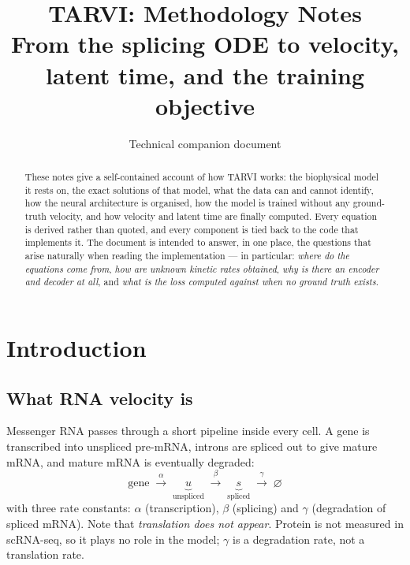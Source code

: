 \documentclass[11pt,a4paper]{article}
\title{\textbf{TARVI: Methodology Notes}\\[0.3em]
\large From the splicing ODE to velocity, latent time, and the training objective}
\author{Technical companion document}
\date{}
\theoremstyle{definition}
\begin{document}
\maketitle

\begin{abstract}
\noindent
These notes give a self-contained account of how TARVI works: the biophysical
model it rests on, the exact solutions of that model, what the data can and
cannot identify, how the neural architecture is organised, how the model is
trained without any ground-truth velocity, and how velocity and latent time
are finally computed. Every equation is derived rather than quoted, and every
component is tied back to the code that implements it. The document is
intended to answer, in one place, the questions that arise naturally when
reading the implementation --- in particular: \emph{where do the equations come
from}, \emph{how are unknown kinetic rates obtained}, \emph{why is there an
encoder and decoder at all}, and \emph{what is the loss computed against when
no ground truth exists}.
\end{abstract}

\tableofcontents
\newpage

\section{Introduction}

\subsection{What RNA velocity is}

Messenger RNA passes through a short pipeline inside every cell. A gene is
transcribed into unspliced pre-mRNA, introns are spliced out to give mature
mRNA, and mature mRNA is eventually degraded:
%
\begin{equation}
\text{gene} \;\xrightarrow{\;\alpha\;}\; \underbrace{u}_{\text{unspliced}}
\;\xrightarrow{\;\beta\;}\; \underbrace{s}_{\text{spliced}}
\;\xrightarrow{\;\gamma\;}\; \varnothing
\end{equation}
%
with three rate constants: $\alpha$ (transcription), $\beta$ (splicing) and
$\gamma$ (degradation of spliced mRNA). Note that \emph{translation does not
appear}. Protein is not measured in scRNA-seq, so it plays no role in the
model; $\gamma$ is a degradation rate, not a translation rate.
\end{document}
